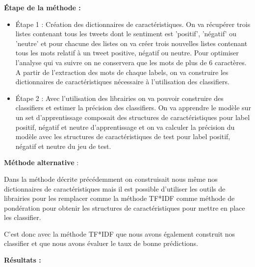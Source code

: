 \par \textbf{Étape de la méthode :} \\
\begin{itemize}
	\item Étape 1 : Création des dictionnaires de caractéristiques. On va récupérer trois listes contenant tous les tweets dont le sentiment est 'positif', 'négatif' ou 'neutre' et pour chacune des listes on va créer trois nouvelles listes contenant tous les mots relatif à un tweet positive, négatif ou neutre. Pour optimiser l'analyse qui va suivre on ne conservera que les mots de plus de 6 caractères. A partir de l'extraction des mots de chaque labels, on va construire les dictionnaires de caractéristiques nécessaire à l'utilisation des classifiers. \\
	\item Étape 2 : Avec l'utilisation des librairies on va pouvoir construire des classifiers et estimer la précision des classifiers. On va apprendre le modèle sur un set d'apprentissage composait des structures de caractéristiques pour label positif, négatif et neutre d'apprentissage et on va calculer la précision du modèle avec les structures de caractéristiques de test pour label positif, négatif et neutre du jeu de test. \\
\end{itemize}

\par \textbf{Méthode alternative }: \\
\par Dans la méthode décrite précédemment on construisait nous même nos dictionnaires de caractéristiques mais il est possible d'utiliser les outils de librairies pour les remplacer comme la méthode TF*IDF comme méthode de pondération pour obtenir les structures de caractéristiques pour mettre en place les classifier.
\par C'est donc avec la méthode TF*IDF que nous avons également construit nos classifier et que nous avons évaluer le taux de bonne prédictions.

\par \textbf{Résultats :} \\


